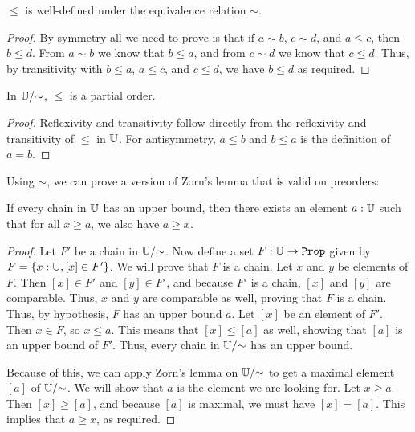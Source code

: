 \documentclass[../math.tex]{subfiles}
\begin{document}
\begin{lemma}
    $\leq$ is well-defined under the equivalence relation $\sim$.
\end{lemma}
\begin{proof}
    By symmetry all we need to prove is that if $a \sim b$, $c \sim d$, and $a
    \leq c$, then $b \leq d$.  From $a \sim b$ we know that $b \leq a$, and from
    $c \sim d$ we know that $c \leq d$.  Thus, by transitivity with $b \leq a$,
    $a \leq c$, and $c \leq d$, we have $b \leq d$ as required.
\end{proof}

\begin{instance}
    In $\mathbb{U}/{\sim}$, $\leq$ is a partial order.
\end{instance}
\begin{proof}
    Reflexivity and transitivity follow directly from the reflexivity and
    transitivity of $\leq$ in $\mathbb{U}$.  For antisymmetry, $a \leq b$ and $b \leq a$
    is the definition of $a = b$.
\end{proof}

Using $\sim$, we can prove a version of Zorn's lemma that is valid on preorders:

\begin{theorem} \label{preorder-zorn}
    If every chain in $\mathbb{U}$ has an upper bound, then there exists an element $a :
    \mathbb{U}$ such that for all $x \geq a$, we also have $a \geq x$.
\end{theorem}
\begin{proof}
    Let $F'$ be a chain in $\mathbb{U}/{\sim}$.  Now define a set $F : \U \to \Prop$
    given by $F = \{x : \mathbb{U}, [x] \in F'\}$.  We will prove that $F$ is a chain.
    Let $x$ and $y$ be elements of $F$.  Then $[x] \in F'$ and $[y] \in F'$, and
    because $F'$ is a chain, $[x]$ and $[y]$ are comparable.  Thus, $x$ and $y$
    are comparable as well, proving that $F$ is a chain.  Thus, by hypothesis,
    $F$ has an upper bound $a$.  Let $[x]$ be an element of $F'$.  Then $x \in
    F$, so $x \leq a$.  This means that $[x] \leq [a]$ as well, showing that
    $[a]$ is an upper bound of $F'$.  Thus, every chain in $\mathbb{U}/{\sim}$ has an
    upper bound.

    Because of this, we can apply Zorn's lemma on $\mathbb{U}/{\sim}$ to get a maximal
    element $[a]$ of $\mathbb{U}/{\sim}$.  We will show that $a$ is the element we are
    looking for.  Let $x \geq a$.  Then $[x] \geq [a]$, and because $[a]$ is
    maximal, we must have $[x] = [a]$.  This implies that $a \geq x$, as
    required.
\end{proof}
\end{document}
